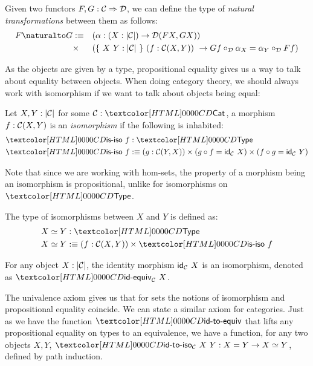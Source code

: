 \begin{definition}
  Given two functors $F, G : \mathcal{C} \Rightarrow \mathcal{D}$, we can define the type
  of \emph{natural transformations} between them as follows:
  \begin{align*}
    \Nat{F}{G} &\ddefeq &&(\alpha : (X : | \Cc |) \to \Dd(FX,GX)) \\
    &\times &&(\{\ X\ Y : | \Cc |\ \}\ (f : \Cc(X,Y))\ \to Gf \circ_{\Dd} \alpha_X = \alpha_Y \circ_{\Dd} Ff)
  \end{align*}
\end{definition}

As the objects are given by a type, propositional equality gives us a
way to talk about equality between objects. When doing category
theory, we should always work with isomorphism if we want to talk
about objects being equal:

\begin{definition}[Isomorphism]
  Let $X, Y : | \mathcal{C} |$ for some $\Cc : \Cat$, a morphism
  $f : \mathcal{C}(X,Y)$ is an \emph{isomorphism} if the following is
  inhabited:
  \begin{align*}
    &\isiso\ f : \Type \\
    &\isiso\ f \ddefeq (g : \Cc(Y,X)) \times (g \circ f = \id_{\Cc}\ X) \times (f \circ g = \id_{\Cc}\ Y)
  \end{align*}
\end{definition}

Note that since we are working with hom-sets, the property of a
morphism being an isomorphism is propositional, unlike for
isomorphisms on $\Type$.

\begin{definition}
  The type of isomorphisms between $X$ and $Y$ is defined as:
  \begin{align*}
  &\Iso{X}{Y} : \Type \\
  &\Iso{X}{Y} \ddefeq (f : \Cc(X,Y)) \times \isiso\ f
  \end{align*}
\end{definition}

For any object $X : | \mathcal{C} |$, the identity morphism $\id_{\Cc}\ X$ is
an isomorphism, denoted as $\idequiv_{\Cc}\ X$.

The univalence axiom gives us that for sets the notions of isomorphism
and propositional equality coincide. We can state a similar axiom for
categories. Just as we have the function $\idtoequiv$ that lifts any
propositional equality on types to an equivalence, we have a function,
for any two objects $X, Y$, $\idtoiso_{\Cc}\ X\ Y : X = Y \to \Iso{X}{Y}$,
defined by path induction.


